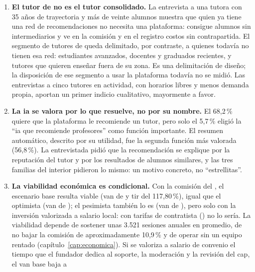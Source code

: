 \begin{enumerate}
          la rechaza; y de las tres familias del interior, dos pagarían
          en la plataforma y una le transferiría al tutor.
    \item \textbf{El tutor de \sistema{} no es el tutor consolidado.} La
          entrevista a una tutora con 35 años de trayectoria y más de
          veinte alumnos muestra que quien ya tiene una red de
          recomendaciones no necesita una plataforma: consigue alumnos sin
          intermediarios y ve en la comisión y en el registro costos sin
          contrapartida. El segmento de tutores de \sistema{} queda
          delimitado, por contraste, a quienes todavía no tienen esa red:
          estudiantes avanzados, docentes y graduados recientes, y tutores
          que quieren enseñar fuera de su zona. Es una delimitación de
          diseño; la disposición de ese segmento a usar la plataforma
          todavía no se midió. Las entrevistas a cinco tutores en
          actividad, con horarios libres y menos demanda propia, aportan un
          primer indicio cualitativo, mayormente a favor.
    \item \textbf{La \gls{ia} se valora por lo que resuelve, no por su
          nombre.} El 68,2\,\% quiere que la plataforma le recomiende un
          tutor, pero solo el 5,7\,\% eligió la ``\gls{ia} que recomiende
          profesores'' como función importante. El resumen automático,
          descrito por su utilidad, fue la segunda función más valorada
          (56,8\,\%). La entrevistada pidió que la recomendación se
          explique por la reputación del tutor y por los resultados de
          alumnos similares, y las tres familias del interior pidieron lo
          mismo: un motivo concreto, no ``estrellitas''.
    \item \textbf{La viabilidad económica es condicional.} Con la
          comisión del \comision{}, el escenario base resulta viable
          (\gls{van} de  y \gls{tir} del 117,80\,\%), igual que
          el optimista (\gls{van} de ); el pesimista también
          lo es (\gls{van} de ), pero solo con la inversión
          valorizada a salario local: con tarifas de contratista
          () no lo sería. La viabilidad depende de
          sostener unas 3.521 sesiones anuales en promedio, de no bajar la
          comisión de aproximadamente 10,9\,\% y de operar sin un equipo
          rentado (capítulo~\ref{cap:economica}). Si se valoriza a salario
          de convenio el tiempo que el fundador dedica al soporte, la
          moderación y la revisión del \gls{cap}, el \gls{van} base baja a

\end{enumerate}
